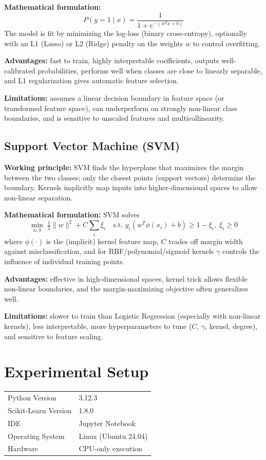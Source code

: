 \documentclass[12pt,a4paper]{article}
\begin{document}
\textbf{Mathematical formulation:}
\[
P(y=1\mid x) = \frac{1}{1+e^{-(w^Tx+b)}}
\]
The model is fit by minimizing the log-loss (binary cross-entropy), optionally with an L1 (Lasso)
or L2 (Ridge) penalty on the weights $w$ to control overfitting.

\textbf{Advantages:} fast to train, highly interpretable coefficients, outputs well-calibrated
probabilities, performs well when classes are close to linearly separable, and L1 regularization
gives automatic feature selection.

\textbf{Limitations:} assumes a linear decision boundary in feature space (or transformed
feature space), can underperform on strongly non-linear class boundaries, and is sensitive to
unscaled features and multicollinearity.

\subsection*{Support Vector Machine (SVM)}
\textbf{Working principle:} SVM finds the hyperplane that maximizes the margin between the two
classes; only the closest points (support vectors) determine the boundary. Kernels implicitly
map inputs into higher-dimensional spaces to allow non-linear separation.

\textbf{Mathematical formulation:} SVM solves
\[
\min_{w,b} \; \tfrac{1}{2}\lVert w \rVert^2 + C\sum_i \xi_i \quad \text{s.t. } y_i(w^T\phi(x_i)+b)\ge 1-\xi_i,\; \xi_i \ge 0
\]
where $\phi(\cdot)$ is the (implicit) kernel feature map, $C$ trades off margin width against
misclassification, and for RBF/polynomial/sigmoid kernels $\gamma$ controls the influence of
individual training points.

\textbf{Advantages:} effective in high-dimensional spaces, kernel trick allows flexible
non-linear boundaries, and the margin-maximizing objective often generalizes well.

\textbf{Limitations:} slower to train than Logistic Regression (especially with non-linear
kernels), less interpretable, more hyperparameters to tune ($C$, $\gamma$, kernel, degree), and
sensitive to feature scaling.

\section{Experimental Setup}
\begin{tabular}{ll}
\toprule
Python Version & 3.12.3 \\
Scikit-Learn Version & 1.8.0 \\
IDE & Jupyter Notebook \\
Operating System & Linux (Ubuntu 24.04) \\
Hardware & CPU-only execution \\
\bottomrule
\end{tabular}
\end{document}
